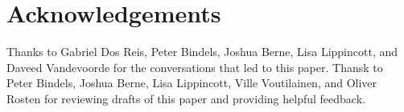 
\section*{Acknowledgements}

Thanks to Gabriel Dos Reis, Peter Bindels, Joshua Berne, Lisa Lippincott, and Daveed Vandevoorde for the conversations that led to this paper. Thansk to Peter Bindels, Joshua Berne, Lisa Lippincott, Ville Voutilainen, and Oliver Rosten for reviewing drafts of this paper and providing helpful feedback.


\renewcommand{\addcontentsline}[3]{}%








